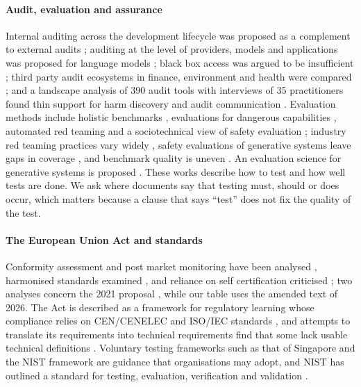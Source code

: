 \documentclass[conference]{IEEEtran}
\begin{document}
\paragraph{Audit, evaluation and assurance} Internal auditing across the development lifecycle was proposed as a complement to external audits \citep{raji2020closing}; auditing at the level of providers, models and applications was proposed for language models \citep{mokander2023auditing}; black box access was argued to be insufficient \citep{casper2024blackbox}; third party audit ecosystems in finance, environment and health were compared \citep{raji2022outsider}; and a landscape analysis of 390 audit tools with interviews of 35 practitioners found thin support for harm discovery and audit communication \citep{ojewale2024towards}. Evaluation methods include holistic benchmarks \citep{liang2023holistic}, evaluations for dangerous capabilities \citep{shevlane2023model,phuong2024evaluating}, automated red teaming \citep{perez2022red} and a sociotechnical view of safety evaluation \citep{weidinger2023sociotechnical}; industry red teaming practices vary widely \citep{feffer2024red}, safety evaluations of generative systems leave gaps in coverage \citep{rauh2024gaps}, and benchmark quality is uneven \citep{reuel2024betterbench,bean2025measuring}. An evaluation science for generative systems is proposed \citep{weidinger2025toward}. These works describe how to test and how well tests are done. We ask where documents say that testing must, should or does occur, which matters because a clause that says ``test'' does not fix the quality of the test.

\paragraph{The European Union Act and standards} Conformity assessment and post market monitoring have been analysed \citep{mokander2021conformity}, harmonised standards examined \citep{gornet2024european}, and reliance on self certification criticised \citep{wachter2024limitations}; two analyses concern the 2021 proposal \citep{mokander2021conformity,veale2021demystifying}, while our table uses the amended text of 2026. The Act is described as a framework for regulatory learning whose compliance relies on CEN/CENELEC and ISO/IEC standards \citep{lewis2025mapping}, and attempts to translate its requirements into technical requirements find that some lack usable technical definitions \citep{guldimann2024complai}. Voluntary testing frameworks such as that of Singapore \citep{lee2023aiverify,harjani2025singapore} and the NIST framework \citep{tabassi2023airmf} are guidance that organisations may adopt, and NIST has outlined a standard for testing, evaluation, verification and validation \citep{nist2025tevv}.
\end{document}

